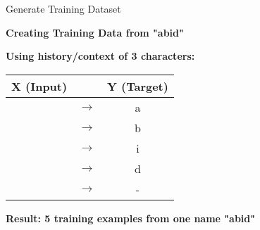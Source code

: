 \documentclass[usenames,dvipsnames]{beamer}
\begin{document}
\begin{frame}{Generate Training Dataset}
\begin{center}
\textbf{Creating Training Data from "abid"}
\end{center}

\vspace{0.5cm}
\begin{center}
\textbf{Using history/context of 3 characters:}
\end{center}

\vspace{0.5cm}
\begin{center}
\begin{tabular}{|c|c|c|}
\hline
\textbf{X (Input)} & & \textbf{Y (Target)} \\
\hline
[-, -, -] & $\rightarrow$ & a \\
[-, -, a] & $\rightarrow$ & b \\
[-, a, b] & $\rightarrow$ & i \\
[a, b, i] & $\rightarrow$ & d \\
[b, i, d] & $\rightarrow$ & - \\
\hline
\end{tabular}
\end{center}

\vspace{0.5cm}
\begin{center}
\textbf{Result: 5 training examples from one name "abid"}
\end{center}
\end{frame}
\end{document}
